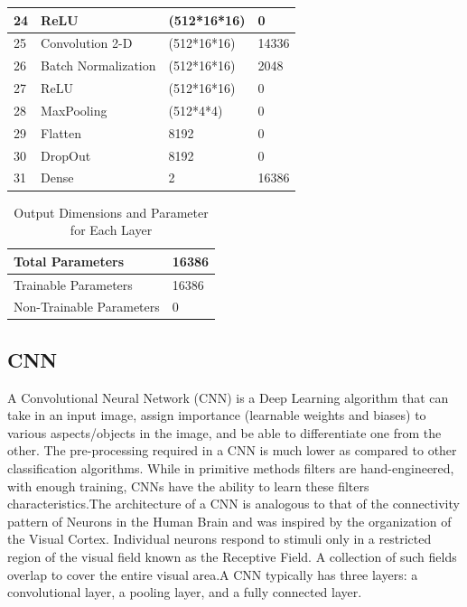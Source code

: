 \begin{table}
\begin{tabular}{|l|l|l|l|}
		24 & ReLU & (512*16*16) & 0 \\                       \hline
		25 & Convolution 2-D & (512*16*16) & 14336 \\        \hline
		26 & Batch Normalization & (512*16*16) & 2048 \\     \hline
		27 & ReLU & (512*16*16) & 0 \\                       \hline
		28 & MaxPooling & (512*4*4) & 0 \\                   \hline
		29 & Flatten & 8192 & 0 \\                           \hline
		30 & DropOut & 8192 & 0 \\                           \hline
		31 & Dense & 2 & 16386 \\\hline
		\end{tabular}
	\end{table}

	\begin{table}[ht]
		\begin{tabularx}{1.03\textwidth}{|X|X|}
			\hline
			Total Parameters & 16386 \\ \hline
			Trainable Parameters & 16386 \\  \hline
			Non-Trainable Parameters & 0 \\ \hline
			\end{tabularx}
			\caption{Output Dimensions and Parameter for Each Layer}
		\end{table}
        
        
        \subsection{CNN}
            A Convolutional Neural Network (CNN) \cite{oshea2015introduction} is a Deep Learning algorithm
            that can take in an input image, assign importance (learnable weights and biases) to various aspects/objects in the image, and be able to differentiate one from the other. The pre-processing required in a CNN is much lower as compared to other classification algorithms. While in primitive methods filters are hand-engineered, with enough training, CNNs have the ability to learn these filters characteristics.The architecture of a CNN is analogous to that of the connectivity pattern of Neurons in the Human Brain and was inspired by the organization of the Visual Cortex. Individual neurons respond to stimuli only in a restricted region of the visual field known as the Receptive Field. A collection of such fields overlap to cover the entire visual area.A CNN typically has three layers: a convolutional layer, a pooling layer, and a fully connected layer.

